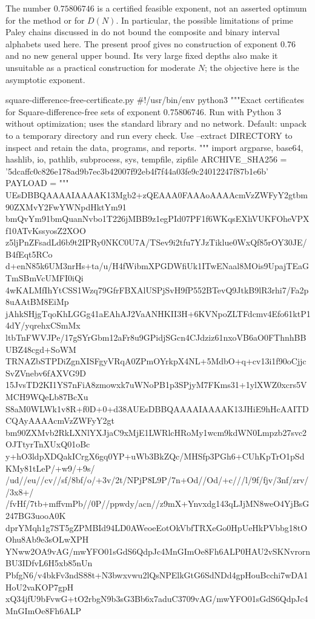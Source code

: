 \documentclass[11pt]{article}
\theoremstyle{definition}
\theoremstyle{remark}
\begin{document}
The number $0.75806746$ is a certified feasible exponent, not an asserted
optimum for the method or for $D(N)$. In particular, the possible limitations
of prime Paley chains discussed in \cite{Krachun2026,Satake2021} do not
bound the composite and binary interval alphabets used here. The present
proof gives no construction of exponent $0.76$ and no new general upper
bound. Its very large fixed depths also make it unsuitable as a practical
construction for moderate $N$; the objective here is the asymptotic exponent.

\appendix

\begin{filecontents*}[overwrite]{square-difference-free-certificate.py}
#!/usr/bin/env python3
"""Exact certificates for Square-difference-free sets of exponent 0.75806746.
Run with Python 3 without optimization; uses the standard library and no network.
Default: unpack to a temporary directory and run every check.
Use --extract DIRECTORY to inspect and retain the data, programs, and reports.
"""
import argparse, base64, hashlib, io, pathlib, subprocess, sys, tempfile, zipfile
ARCHIVE_SHA256 = '5dcaffc0c826e178ad9b7ec3b42007f92eb4f7f44a03fe9c24012247f87b1e6b'
PAYLOAD = """
UEsDBBQAAAAIAAAAK13Mgb2+zQEAAA0FAAAoAAAAcmVzZWFyY2gtbm90ZXMvY2FwYWNpdHktYm91
bmQvYm91bmQuanNvbo1T226jMBB9z1egPId07PF1f6WKqsEXhVUKFOheVPXf10ATvKssyosZ2XOO
z5ljPnZFsadLd6b9t2IPRy0NKC0U7A/TSev9i2tfu7YJzTiklue0WxQf85rOY30JE/B4fEqt5RCo
d+enN85k6UM3nrHs+ta/u/H4fWibmXPGDWfiUk1ITwENaal8MOis9UpajTEaGTmSBmVcUMFI0iQi
4wKALMfIhYtCSS1Wzq79GfrFBXAlUSPjSvH9fP552BTevQ9JtkB9lR3rhi7/Fa2p8uAAtBM8EiMp
jAhkSHjgTqoKhLGGg41aEAhAJ2VaANHKII3H+6KVNpoZLTFdcmv4Efo61ktP14dY/yqrehxCSmMx
ltbTnFWVJPe/17gSYrGbm12aFr8u9GPidjSGcn4CJdziz61nxoVB6aO0FThnhBBUBZ48cgd+SoWM
TRNAZbSTPDiZgnXISFgyVRqA0ZPmOYrkpX4NL+5MdbO+q+cv13i1f90oCjjcSvZVnebv6fAXVG9D
15JvsTD2KI1YS7nFiA8zmowxk7uWNoPB1p3SPjyM7FKms31+1ylXWZ0xcrs5VMCH9WQeLb87BcXu
S8aM0WLWk1v8R+f0D+0+d38AUEsDBBQAAAAIAAAAK13JHiE9hHcAAITDCQAyAAAAcmVzZWFyY2gt
bm90ZXMvb2RkLXNlYXJjaC9xMjE1LWRlcHRoMy1wcm9kdWN0Lmpzb27svc2OJTtyrTnXUxQ01oBc
y+hO3ldpXDQakICrgX6gq0YP+uWb3BkZQc/MHSfp3PGh6+CUhKpTrO1pSdKMy81tLeP/+w9/+9s/
/ud//eu//cv//sf/8bf/o/+3v/2t/NPjP8L9P/7n+Od//Od/+c///l/9f/fjv/3nf/zrv//3x8+/
/fvHf/7tb+mffvmPb//0P//ppwdy/acn//z9mX+Ynvxdg143qLJjMN8weO4YjBsG247BG3uooA0K
dprYMqh1g7ST5gZPMBId94LD0AWeoeEotOkVbfTRXeGo0HpUeHkPVbbg18tOOhu8Ab9e3sOLwXPH
YNww2OA9vAG/mwYFO01sGdS6QdpJc4MnGImOe8Fh6ALP0HAU2vSKNvrornBU3IDfvL6H5xb85nUn
PbfgN6/v4bkFv3ndS88t+N3bwxvwu2lQsNPElkGtG6SdNDd4gpHouBcchi7wDA1HoU2vaKOP7gpH
xQ34jfU9bFvwG+tO2rbgN9b3sG3Bb6x7aduC3709vAG/mwYFO01sGdS6QdpJc4MnGImOe8Fh6ALP

\end{filecontents*}
\end{document}
